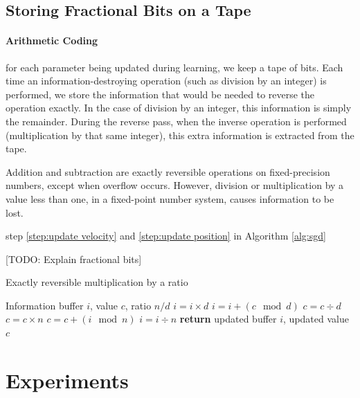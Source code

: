 \documentclass{article}
\begin{document}
\subsection{Storing Fractional Bits on a Tape}

\paragraph{Arithmetic Coding} 	\cite{steinruecken2014a}

for each parameter being updated during learning, we keep a tape of bits.
Each time an information-destroying operation (such as division by an integer) is performed, we store the information that would be needed to reverse the operation exactly.  In the case of division by an integer, this information is simply the remainder.
During the reverse pass, when the inverse operation is performed (multiplication by that same integer), this extra information is extracted from the tape.

Addition and subtraction are exactly reversible operations on fixed-precision numbers, except when overflow occurs.
However, division or multiplication by a value less than one, in a fixed-point number system, causes information to be lost.

step \ref{step:update velocity} and \ref{step:update position} in Algorithm \ref{alg:sgd}

[TODO: Explain fractional bits]

\begin{algorithm}
   \caption{Exactly reversible multiplication by a ratio}
   \label{alg:reversible-mult}
\begin{algorithmic}[1]
    Information buffer $i$, value $c$, ratio $n / d$
   \State $i = i \times d$ 
   \State $i = i + (c \! \mod d)$ 
   \State $c = c \div d$ 
   \State $c = c \times n$ 
   \State $c = c +  (i \! \mod n)$ 
   \State $i = i \div n$ 
   \State \textbf{return} updated buffer $i$, updated value $c$
\end{algorithmic}
\end{algorithm}
%



\section{Experiments}
\end{document}
